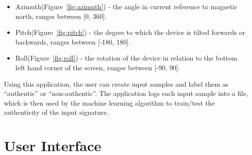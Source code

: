 \documentclass[12pt]{article}
\begin{document}
\begin{itemize}
\item Azimuth(Figure~\ref{fig:azimuth}) - the angle in current reference to magnetic north, ranges between [0. 360]. 
\item Pitch(Figure~\ref{fig:pitch}) - the degree to which the device is tilted forwards or backwards, ranges between [-180, 180].
\item Roll(Figure~\ref{fig:roll}) - the rotation of the device in relation to the bottom left hand corner of the screen, ranges between [-90, 90].
\end{itemize}

Using this application, the user can create input samples and label them as ``authentic'' or ``non-authentic''. The application logs each input sample into a file, which is then used by the machine learning algorithm to train/test the authenticity of the input signature.

\section{User Interface}
\end{document}
